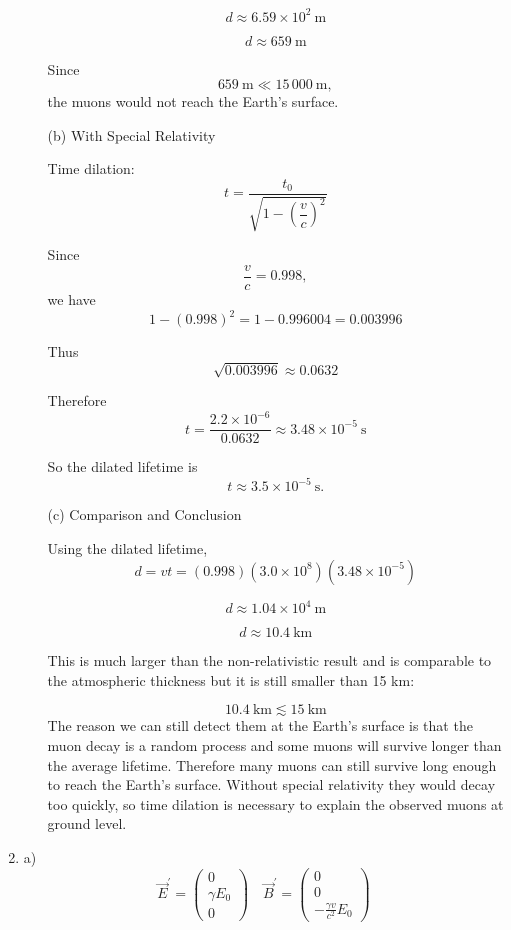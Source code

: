 \documentclass[12pt]{article}
\begin{document}
\begin{enumerate}
\begin{enumerate}
\[
d\approx 6.59\times10^2\ \text{m}
\]

\[
d\approx 659\ \text{m}
\]

Since
\[
659\ \text{m} \ll 15\,000\ \text{m},
\]
the muons would not reach the Earth's surface.

\vspace{1em}

\item[(b)] With Special Relativity

Time dilation:
\[
t=\frac{t_0}{\sqrt{1-\left(\dfrac{v}{c}\right)^2}}
\]

Since
\[
\frac{v}{c}=0.998,
\]
we have
\[
1-(0.998)^2=1-0.996004=0.003996
\]

Thus
\[
\sqrt{0.003996}\approx 0.0632
\]

Therefore
\[
t=\frac{2.2\times10^{-6}}{0.0632}
\approx 3.48\times10^{-5}\ \text{s}
\]

So the dilated lifetime is
\[
t\approx 3.5\times10^{-5}\ \text{s}.
\]

\vspace{1em}

\item[(c)] Comparison and Conclusion

Using the dilated lifetime,
\[
d=vt=(0.998)(3.0\times10^8)(3.48\times10^{-5})
\]

\[
d\approx 1.04\times10^4\ \text{m}
\]

\[
d\approx 10.4\ \text{km}
\]

This is much larger than the non-relativistic result and is comparable to the atmospheric thickness but it is still smaller than 15 km:

\[
10.4\ \text{km} \lesssim 15\ \text{km}
\]
The reason we can still detect them at the Earth's surface is that the muon decay is a random process and some muons will survive longer than the average lifetime. Therefore many muons can still survive long enough to reach the Earth's surface. Without special relativity they would decay too quickly, so time dilation is necessary to explain the observed muons at ground level.

\end{enumerate}

\vspace{1em}
\item a)\[
\vec{E}^{\prime} = \begin{pmatrix} 0 \\ \gamma E_0 \\ 0 \end{pmatrix} \quad \vec{B}^{\prime} = \begin{pmatrix} 0 \\ 0 \\ -\frac{\gamma v}{c^2} E_0 \end{pmatrix}
\]


\end{enumerate}
\end{document}
